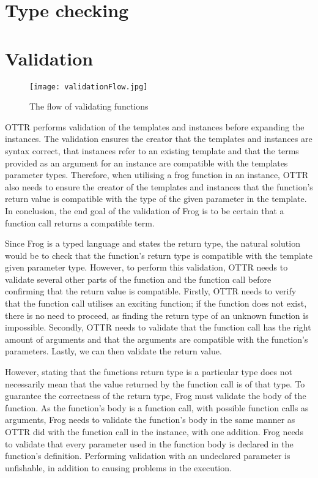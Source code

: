 \section{Type checking}

\section{Validation}
\begin{figure}
    \centering
    \texttt{[image: validationFlow.jpg]}
    \caption{The flow of validating functions}
    \label{fig:LC-explenations}
\end{figure}

OTTR performs validation of the templates and instances before expanding the instances. The validation ensures the creator that the templates and instances are syntax correct, that instances refer to an existing template and that the terms provided as an argument for an instance are compatible with the templates parameter types. Therefore, when utilising a frog function in an instance, OTTR also needs to ensure the creator of the templates and instances that the function's return value is compatible with the type of the given parameter in the template. In conclusion, the end goal of the validation of Frog is to be certain that a function call returns a compatible term. 

\para
Since Frog is a typed language and states the return type, the natural solution would be to check that the function's return type is compatible with the template given parameter type. However, to perform this validation, OTTR needs to validate several other parts of the function and the function call before confirming that the return value is compatible. Firstly, OTTR needs to verify that the function call utilises an exciting function; if the function does not exist, there is no need to proceed, as finding the return type of an unknown function is impossible. Secondly, OTTR needs to validate that the function call has the right amount of arguments and that the arguments are compatible with the function's parameters. Lastly, we can then validate the return value. 

\para
However, stating that the functions return type is a particular type does not necessarily mean that the value returned by the function call is of that type. To guarantee the correctness of the return type, Frog must validate the body of the function. As the function's body is a function call, with possible function calls as arguments, Frog needs to validate the function's body in the same manner as OTTR did with the function call in the instance, with one addition. Frog needs to validate that every parameter used in the function body is declared in the function's definition. Performing validation with an undeclared parameter is unfishable, in addition to causing problems in the execution. 

